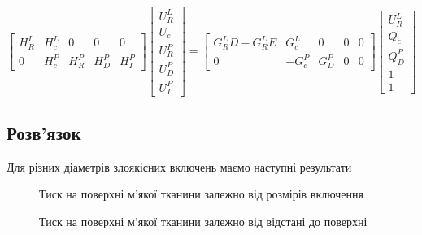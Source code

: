\begin{equation*}
    \begin{bmatrix}
        H_R^L & H_c^L & 0 & 0 & 0 \\ 
        0 & H_c^P & H_R^P & H_D^P & H_I^P
    \end{bmatrix}
    \begin{bmatrix}
        U_R^L \\ 
        U_c \\
        U_R^P \\ 
        U_D^P \\ 
        U_I^P  
    \end{bmatrix} 
    = 
    \begin{bmatrix}
        G_R^LD-G_R^LE & G_c^L & 0 & 0 & 0\\ 
        0 & -G_c^P & G_D^P & 0 & 0
    \end{bmatrix}
    \begin{bmatrix}
        U_R^L \\
        Q_c \\
        Q_D^P \\
        1 \\
        1  
    \end{bmatrix} 
\end{equation*}



\subsection{Розв'язок}

Для різних діаметрів злоякісних включень маємо наступні результати

\begin{figure}[ht!]
    \centering
    \caption{Тиск на поверхні м'якої тканини залежно від розмірів включення}
    \label{fig:elasticity_2d_solution_border_pressure_size}
\end{figure}

\begin{figure}[ht!]
    \centering
    \caption{Тиск на поверхні м'якої тканини залежно від відстані до поверхні}
    \label{fig:elasticity_2d_solution_border_pressure_depth}
\end{figure}

